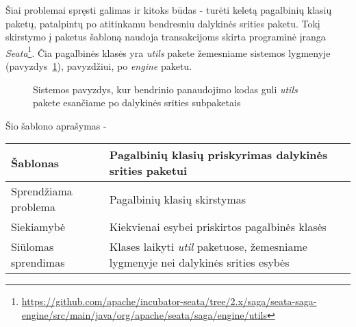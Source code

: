 Šiai problemai spręsti galimas ir kitoks būdas - turėti keletą pagalbinių klasių paketų, patalpintų po atitinkamu bendresniu dalykinės srities
 paketu.
Tokį skirstymo į paketus šabloną naudoja transakcijoms skirta programinė įranga \textit{Seata}\footnote{\url{https://github.com/apache/incubator-seata/tree/2.x/saga/seata-saga-engine/src/main/java/org/apache/seata/saga/engine/utils}}.
Čia pagalbinės klasės yra \textit{utils} pakete žemesniame sistemos lygmenyje (pavyzdys~\ref{img:domainHelpers}), pavyzdžiui, po \textit{engine} paketu.
\begin{figure}[H]
    \snugshade
    \endsnugshade
    \caption{Sistemos pavyzdys, kur bendrinio panaudojimo kodas guli \textit{utils} pakete esančiame po dalykinės srities subpaketais}
    \label{img:domainHelpers}
\end{figure}
Šio šablono aprašymas -
\begin{center}
    \begin{tabular}{|p{5cm}|p{10cm}|}
        \hline
        Šablonas &  Pagalbinių klasių priskyrimas dalykinės srities paketui \\ [0.5ex]
        \hline\hline
        Sprendžiama problema & Pagalbinių klasių skirstymas\\
        \hline
        Siekiamybė &  Kiekvienai esybei priskirtos pagalbinės klasės\\
        \hline
        Siūlomas sprendimas & Klases laikyti \textit{util} paketuose, žemesniame lygmenyje nei dalykinės srities esybės \\
        \hline
    \end{tabular}
\end{center}

